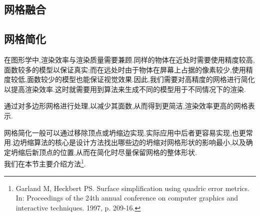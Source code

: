 \documentclass{ctexart}
\begin{document}
\subsection{网格融合}
\subsection{网格简化}
在图形学中,渲染效率与渲染质量需要兼顾.同样的物体在近处时需要使用精度较高,面数较多的模型以保证真实;而在远处时由于物体在屏幕上占据的像素较少,使用精度较低,面数较少的模型也能保证视觉效果.因此,我们需要对高精度的网格进行简化以提高渲染效率.这时就需要用到算法来生成不同的模型用于不同情况下的渲染.
\begin{definition}
    通过对多边形网格进行处理,以减少其面数,从而得到更简洁,渲染效率更高的网格表示.
\end{definition}
网格简化一般可以通过移除顶点或坍缩边实现,实际应用中后者更容易实现,也更常用.边坍缩算法的核心是设计方法找出哪些边的坍缩对网格形状的影响最小,以及确定坍缩后新顶点的位置,从而在简化时尽量保留网格的整体形状.\\
\indent 我们在本节主要介绍方法\footnote{Garland M, Heckbert PS. Surface simplification using quadric error metrics. In: Proceedings of the 24th annual conference on computer graphics and interactive techniques. 1997, p. 209-16.}.
\end{document}
